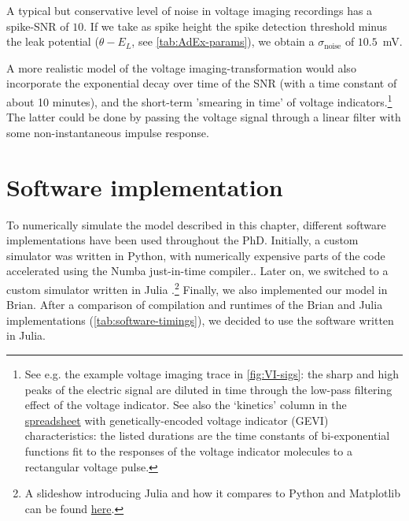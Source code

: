 A typical but conservative level of noise in voltage imaging recordings has a spike-SNR of $10$. If we take as spike height the spike detection threshold minus the leak potential ($θ - E_L$, see \cref{tab:AdEx-params}), we obtain a $σ_\text{noise}$ of $10.5$~mV.

A more realistic model of the voltage imaging-transformation would also incorporate the exponential decay over time of the SNR (with a time constant of about 10 minutes), and the short-term 'smearing in time' of voltage indicators.\footnote{
    See e.g. the example voltage imaging trace in \cref{fig:VI-sigs}: the sharp and high peaks of the electric signal are diluted in time through the low-pass filtering effect of the voltage indicator. See also the `kinetics' column in the  \href{https://docs.google.com/spreadsheets/d/1W9Y3az4i1xdvahpdyqtsTG8F81LXK2T6wzRgsXHN3z0/edit}{spreadsheet} with genetically-encoded voltage indicator (GEVI) characteristics: the listed durations are the time constants of bi-exponential functions fit to the responses of the voltage indicator molecules to a rectangular voltage pulse.
}
The latter could be done by passing the voltage signal through a linear filter with some non-instantaneous impulse response.



\section{Software implementation}
\label{sec:software}

To numerically simulate the model described in this chapter, different software implementations have been used throughout the PhD. Initially, a custom simulator was written in Python, with numerically expensive parts of the code accelerated using the Numba just-in-time compiler.\cite{Lam2015NumbaLLVMbasedPythona}. Later on, we switched to a custom simulator written in Julia \cite{Bezanson2017JuliaFreshApproach}.\footnote{
    A slideshow introducing Julia and how it compares to Python and Matplotlib can be found \href{https://tomasfiers.net/posts/julia-for-scientists/}{here}.
}
Finally, we also implemented our model in Brian\cite{Stimberg2019BrianIntuitiveEfficient}.
After a comparison of compilation and runtimes of the Brian and Julia implementations (\cref{tab:software-timings}), we decided to use the software written in Julia.

